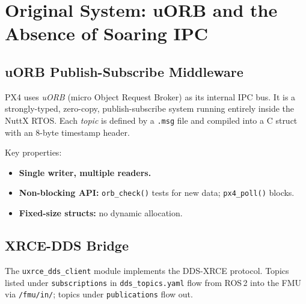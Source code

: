 \documentclass[12pt,a4paper]{report}
\begin{document}
\section{Original System: uORB and the Absence of Soaring IPC}

\subsection{uORB Publish-Subscribe Middleware}

PX4 uses \emph{uORB} (micro Object Request Broker) as its internal IPC bus.
It is a strongly-typed, zero-copy, publish-subscribe system running entirely
inside the NuttX RTOS. Each \emph{topic} is defined by a \texttt{.msg} file
and compiled into a C struct with an 8-byte timestamp header.

Key properties:
\begin{itemize}
  \item \textbf{Single writer, multiple readers.}
  \item \textbf{Non-blocking API:} \texttt{orb\_check()} tests for new data;
        \texttt{px4\_poll()} blocks.
  \item \textbf{Fixed-size structs:} no dynamic allocation.
\end{itemize}

\subsection{XRCE-DDS Bridge}

The \texttt{uxrce\_dds\_client} module implements the DDS-XRCE
protocol. Topics listed under \texttt{subscriptions} in
\texttt{dds\_topics.yaml} flow from ROS\,2 into the FMU via
\texttt{/fmu/in/}; topics under \texttt{publications} flow out.

\begin{center}
\end{center}
\end{document}
